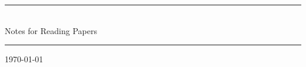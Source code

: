 \documentclass[10pt]{article}
\begin{document}
%
%
%

\onecolumn
\thispagestyle{empty}

\begin{center}
  \noindent\rule{\linewidth}{1mm}\\
  \vspace*{5mm}
  \textsf{\Huge Notes for Reading Papers \\}
  \vspace*{5mm}
  \rule{\linewidth}{1mm}
\end{center}

\begin{center}
  {\large \today}
\end{center}
\vspace*{10mm}
\end{document}
